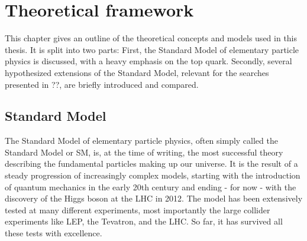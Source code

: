 \chapter{Theoretical framework}
\label{ch:theory}

This chapter gives an outline of the theoretical concepts and models used in this thesis. It is split into two parts: First, the Standard Model of elementary particle physics is discussed, with a heavy emphasis on the top quark. Secondly, several hypothesized extensions of the Standard Model, relevant for the searches presented in ??, are briefly introduced and compared.

\section{Standard Model}


The Standard Model of elementary particle physics, often simply called the Standard Model or SM, is, at the time of writing, the most successful theory describing the fundamental particles making up our universe. It is the result of a steady progression of increasingly complex models, starting with the introduction of quantum mechanics in the early 20th century and ending - for now - with the discovery of the Higgs boson at the LHC in 2012. The model has been extensively tested at many different experiments, most importantly the large collider experiments like LEP, the Tevatron, and the LHC. So far, it has survived all these tests with excellence.

